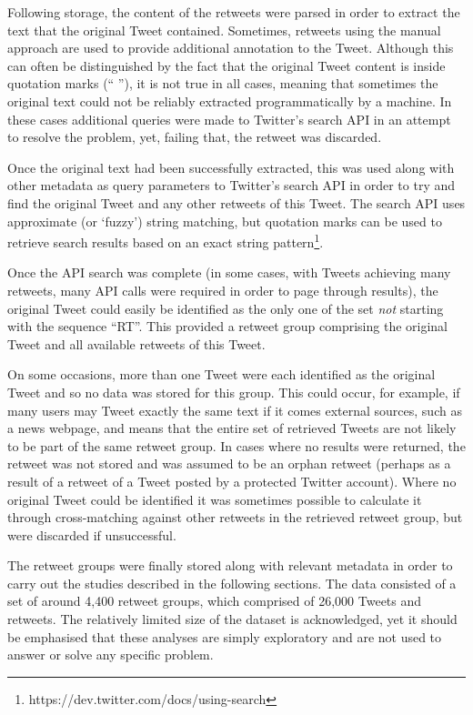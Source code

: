 Following storage, the content of the retweets were parsed in order to extract the text that the original Tweet contained. Sometimes, retweets using the manual approach are used to provide additional annotation to the Tweet. Although this can often be distinguished by the fact that the original Tweet content is inside quotation marks (`` ''), it is not true in all cases, meaning that sometimes the original text could not be reliably extracted programmatically by a machine. In these cases additional queries were made to Twitter's search API in an attempt to resolve the problem, yet, failing that, the retweet was discarded.

Once the original text had been successfully extracted, this was used along with other metadata as query parameters to Twitter's search API in order to try and find the original Tweet and any other retweets of this Tweet. The search API uses approximate (or `fuzzy') string matching, but quotation marks can be used to retrieve search results based on an exact string pattern\footnote{https://dev.twitter.com/docs/using-search}.

Once the API search was complete (in some cases, with Tweets achieving many retweets, many API calls were required in order to page through results), the original Tweet could easily be identified as the only one of the set \textit{not} starting with the sequence ``RT''. This provided a retweet group comprising the original Tweet and all available retweets of this Tweet.

On some occasions, more than one Tweet were each identified as the original Tweet and so no data was stored for this group. This could occur, for example, if many users may Tweet exactly the same text if it comes external sources, such as a news webpage, and means that the entire set of retrieved Tweets are not likely to be part of the same retweet group. In cases where no results were returned, the retweet was not stored and was assumed to be an orphan retweet (perhaps as a result of a retweet of a Tweet posted by a protected Twitter account). Where no original Tweet could be identified it was sometimes possible to calculate it through cross-matching against other retweets in the retrieved retweet group, but were discarded if unsuccessful.

The retweet groups were finally stored along with relevant metadata in order to carry out the studies described in the following sections. The data consisted of a set of around 4,400 retweet groups, which comprised of 26,000 Tweets and retweets. The relatively limited size of the dataset is acknowledged, yet it should be emphasised that these analyses are simply exploratory and are not used to answer or solve any specific problem.


